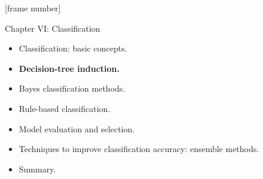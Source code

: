 \documentclass[aspectratio=169,t,table]{beamer}
\begin{document}
  {
    [frame number]
    \begin{frame}{Chapter VI: Classification}
        \begin{itemize}
            \item Classification: basic concepts.
            \item \textbf{Decision-tree induction.}
            \item Bayes classification methods.
            \item Rule-based classification.
            \item Model evaluation and selection.
            \item Techniques to improve classification accuracy: ensemble methods.
            \item Summary.
        \end{itemize}
    \end{frame}
  }
\end{document}
